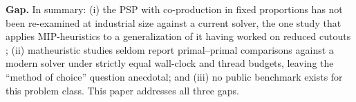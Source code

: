 \medskip
\noindent\textbf{Gap.} In summary: (i) the PSP with co-production in
fixed proportions has not been re-examined at industrial size against
a current solver, the one study that applies MIP-heuristics to a
generalization of it having worked on reduced cutouts
\citep{villasboas2021modeling}; (ii) matheuristic studies seldom
report primal--primal comparisons against a modern solver under
strictly equal wall-clock and thread budgets, leaving the ``method of
choice'' question anecdotal; and (iii) no public benchmark exists for
this problem class. This paper addresses all three gaps.
